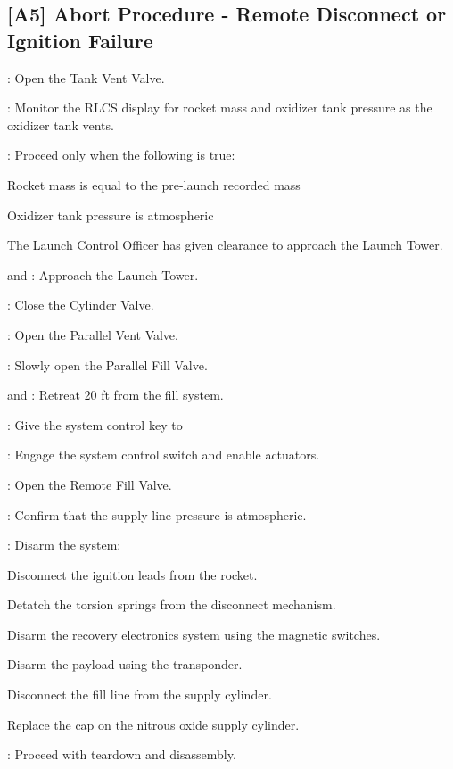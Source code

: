 \subsection{[A5] Abort Procedure - Remote Disconnect or Ignition Failure}
\begin{checklist}
    \item \control{}: Open the Tank Vent Valve.
    \item \control{}: Monitor the RLCS display for rocket mass and oxidizer tank pressure as the oxidizer tank vents.
    \item \ops{}: Proceed only when the following is true:
    \begin{checklist}
        \item Rocket mass is equal to the pre-launch recorded mass
        \item Oxidizer tank pressure is atmospheric
        \item The Launch Control Officer has given clearance to approach the Launch Tower.
    \end{checklist}
    \item \primary{} and \secondary: Approach the Launch Tower.
    \item \primary{}: Close the Cylinder Valve.
    \item \primary{}: Open the Parallel Vent Valve.
    \item \primary{}: Slowly open the Parallel Fill Valve.
    \item \primary{} and \secondary: Retreat 20 ft from the fill system.
    \item \ops: Give the system control key to \control{}
    \item \control{}: Engage the system control switch and enable actuators.
    \item \control{}: Open the Remote Fill Valve.
    \item \control{}: Confirm that the supply line pressure is atmospheric.
    \item \primary{}: Disarm the system:
        \begin{checklist}    
            \item Disconnect the ignition leads from the rocket.
            \item Detatch the torsion springs from the disconnect mechanism.
            \item Disarm the recovery electronics system using the magnetic switches.
            \item Disarm the payload using the transponder.
            \item Disconnect the fill line from the supply cylinder.
            \item Replace the cap on the nitrous oxide supply cylinder.
        \end{checklist}
    \item \ops{}: Proceed with teardown and disassembly.
\end{checklist}
\setcounter{checklistnum}{0}


